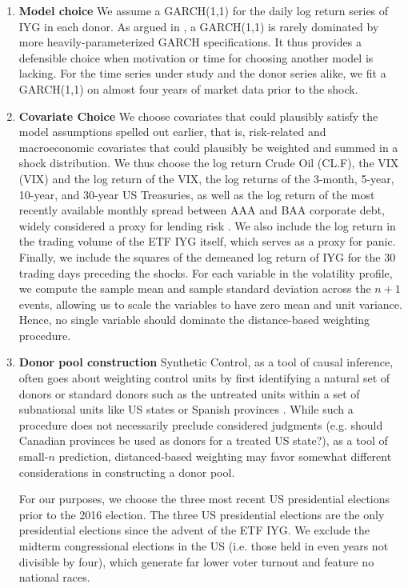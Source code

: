 \documentclass[11pt]{article}
\theoremstyle{definition}
\begin{document}
\begin{enumerate}
    \item \textbf{Model choice} We assume a GARCH(1,1) for the daily log return series of IYG in each donor.  As argued in \citet{hansen2005forecast}, a GARCH(1,1) is rarely dominated by more heavily-parameterized GARCH specifications.  It thus provides a defensible choice when motivation or time for choosing another model is lacking.  For the time series under study and the donor series alike, we fit a GARCH(1,1) on almost four years of market data prior to the shock.

    \item \textbf{Covariate Choice} We choose covariates that could plausibly satisfy the model assumptions spelled out earlier, that is, risk-related and macroeconomic covariates that could plausibly be weighted and summed in a shock distribution.  We thus choose the log return Crude Oil (CL.F), the VIX (VIX) and the log return of the VIX, the log returns of the 3-month, 5-year, 10-year, and 30-year US Treasuries, as well as the log return of the most recently available monthly spread between AAA and BAA corporate debt, widely considered a proxy for lending risk \citep{goodell2013us, kane1996p}.  We also include the log return in the trading volume of the ETF IYG itself, which serves as a proxy for panic.  Finally, we include the squares of the demeaned log return of IYG for the 30 trading days preceding the shocks.  For each variable in the volatility profile, we compute the sample mean and sample standard deviation across the $n+1$ events, allowing us to scale the variables to have zero mean and unit variance.  Hence, no single variable should dominate the distance-based weighting procedure.

    \item \textbf{Donor pool construction} Synthetic Control, as a tool of causal inference, often goes about weighting control units by first identifying a natural set of donors or standard donors such as the untreated units within a set of subnational units like US states or Spanish provinces \citep{abadie2003economic, abadie2010synthetic}.  While such a procedure does not necessarily preclude considered judgments (e.g. should Canadian provinces be used as donors for a treated US state?), as a tool of small-$n$ prediction, distanced-based weighting may favor somewhat different considerations in constructing a donor pool. 
    
    For our purposes, we choose the three most recent US presidential elections prior to the 2016 election.  The three US presidential elections are the only presidential elections since the advent of the ETF IYG.  We exclude the midterm congressional elections in the US (i.e. those held in even years not divisible by four), which generate far lower voter turnout and feature no national races.


\end{enumerate}
\end{document}
